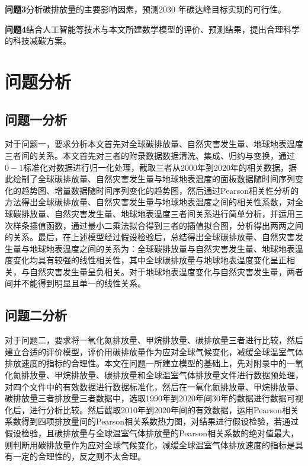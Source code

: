 \documentclass[withoutpreface,bwprint]{cumcmthesis}
\begin{document}
\textbf{问题3}分析碳排放量的主要影响因素，预测2030 年碳达峰目标实现的可行性。 

\textbf{问题4}结合人工智能等技术与本文所建数学模型的评价、预测结果，提出合理科学的科技减碳方案。  


\section{问题分析}
\subsection{问题一分析}
对于问题一，要求分析本文首先对全球碳排放量、自然灾害发生量、地球地表温度三者间的关系。本文首先对三者的附录数据数据清洗、集成、归约与变换，通过$0-1$标准化对数据进行归一化处理，截取三者从2000年到2020年的相关数据，据此绘制了全球碳排放量、自然灾害发生量与地球地表温度的面板数据随时间序列变化的趋势图、增量数据随时间序列变化的趋势图，然后通过Pearson相关性分析的方法得出全球碳排放量、自然灾害发生量与地球地表温度之间的相关性系数，对全球碳排放量、自然灾害发生量、地球地表温度三者间关系进行简单分析，并运用三次样条插值函数，通过最小二乘法拟合得到三者的插值拟合图，分析得出两两之间的关系。最后，在上述模型经过假设检验后，总结得出全球碳排放量、自然灾害发生量与地球地表温度之间的关系为：全球碳排放量与自然灾害发生量、地球地表温度变化均具有较强的线性相关性，其中全球碳排放量与地球地表温度变化呈正相关，与自然灾害发生量呈负相关。对于地球地表温度变化与自然灾害发生量，两者间并不能得到明显且单一的线性关系。

\subsection{问题二分析}	
对于问题二，要求将一氧化氮排放量、甲烷排放量、碳排放量三者进行比较，然后建立合适的评价模型，评价用碳排放量作为应对全球气候变化，减缓全球温室气体排放速度的指标的合理性。本文在问题一所建立模型的基础上，先对附录中的一氧化氮排放量、甲烷排放量、碳排放量和全球温室气体排放量文件进行数据预处理，对四个文件中的有效数据进行数据标准化，然后在一氧化氮排放量、甲烷排放量、碳排放量三者排放量三者数据中，选取1990年到2020年间30年的数据进行数据可视化后，进行分析比较。然后截取2010年到2020年间的有效数据，运用Pearson相关系数得到四项排放量间的Pearson相关系数热力图，对结果进行假设检验，若通过假设检验，且碳排放量与全球温室气体排放量的Pearson相关系数的绝对值最大，则判断用碳排放量作为应对全球气候变化，减缓全球温室气体排放速度的指标是具有一定的合理性的，反之则不太合理。
\end{document}
